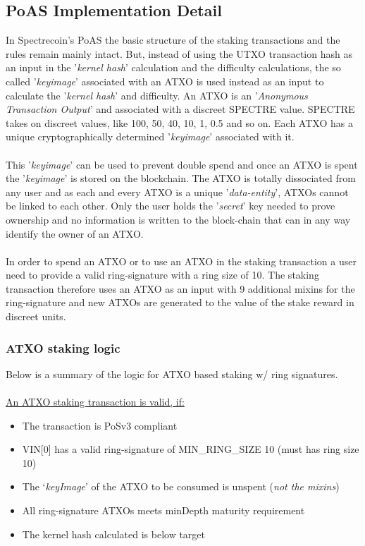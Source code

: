 \subsection{PoAS Implementation Detail}
In Spectrecoin's PoAS the basic structure of the staking transactions and
the rules remain mainly intact. But, instead of using the UTXO transaction
hash as an input in the '\textit{kernel hash}' calculation and the
difficulty calculations, the so called '\textit{keyimage}' associated with
an ATXO is used instead as an input to calculate the '\textit{kernel hash}'
and difficulty. An ATXO is an '\textit{Anonymous Transaction Output}' and
associated with a discreet SPECTRE value. SPECTRE takes on discreet values,
like 100, 50, 40, 10, 1, 0.5 and so on. Each ATXO has a unique
cryptographically determined '\textit{keyimage}' associated with it.
\\
\\
\noindent
This '\textit{keyimage}' can be used to prevent double spend and once an
ATXO is spent the '\textit{keyimage}' is stored on the blockchain. The ATXO
is totally dissociated from any user and as each and every ATXO is a unique
'\textit{data-entity}', ATXOs cannot be linked to each other. Only the user
holds the '\textit{secret}' key needed to prove ownership and no information
is written to the block-chain that can in any way identify the owner of an
ATXO.
\\
\\
\noindent
In order to spend an ATXO or to use an ATXO in the staking transaction a user
need to provide a valid ring-signature with a ring size of 10. The staking
transaction therefore uses an ATXO as an input with 9 additional mixins for
the ring-signature and new ATXOs are generated to the value of the stake
reward in discreet units.



\subsubsection{ATXO staking logic}
Below is a summary of the logic for ATXO based staking w/ ring signatures.
\\
\\
\noindent
\underline{An ATXO staking transaction is valid, if:}
\begin{itemize}
	\item The transaction is PoSv3 compliant
	\item VIN[0] has a valid ring-signature of MIN\_RING\_SIZE 10 (must has ring size 10)
	\item The ‘\textit{keyImage}’ of the ATXO to be consumed is unspent (\textit{not the mixins})
	\item All ring-signature ATXOs meets minDepth maturity requirement
	\item The kernel hash calculated is below target
\end{itemize}
\newpage




